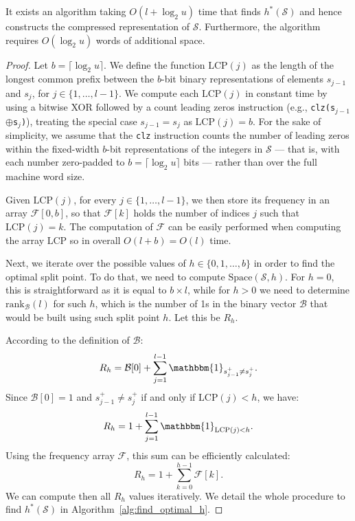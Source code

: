 \begin{theorem}
    It exists an algorithm taking $O(l + \log_2 u)$ time that finds $h^*(\mathcal S)$ and hence constructs the compressed representation of $\mathcal S$. Furthermore, the algorithm requires $O(\log_2 u)$ words of additional space.
\end{theorem}
\begin{proof}
Let \( b = \lceil \log_2 u \rceil \). We define the function \(\mathrm{LCP}(j)\) as the length of the longest common prefix between the \(b\)-bit binary representations of elements \( s_{j-1} \) and \( s_j \), for \( j \in \{1, \dots, l-1\} \). We compute each \(\mathrm{LCP}(j)\) in constant time by using a bitwise XOR followed by a count leading zeros instruction (e.g., \texttt{clz(s\(_{j-1}\)\(\oplus\)s\(_j\))}), treating the special case \(s_{j-1}=s_j\) as \(\mathrm{LCP}(j)=b\). For the sake of simplicity, we assume that the \texttt{clz} instruction counts the number of leading zeros within the fixed-width $b$-bit representations of the integers in $\mathcal S$ — that is, with each number zero-padded to $b = \lceil \log_2 u\rceil$ bits — rather than over the full machine word size.

Given $\mathrm{LCP}(j)$, for every $j \in \{1, \dots, l-1\}$, we then store its frequency in an array $\mathcal{F}[0,b]$, so that $\mathcal{F}[k]$ holds the number of indices $j$ such that $\mathrm{LCP}(j)=k$. The computation of $\mathcal{F}$ can be easily performed when computing the array $\mathrm{LCP}$ so in overall $O(l+b) = O(l)$ time.

Next, we iterate over the possible values of $h \in \{0, 1, \dots, b\}$ in order to find the optimal split point. To do that, we need to compute $\mathrm{Space}(\mathcal S, h)$. For $h = 0$, this is straightforward as it is equal to $b \times l$, while for $h >0$ we need to determine $\mathrm{rank}_{\mathcal{B}}(l)$ for such $h$, which is the number of 1s in the binary vector $\mathcal{B}$ that would be built using such split point $h$. Let this be $R_h$.

According to the definition of $\mathcal{B}$:
\begin{equation*}
    R_h = \mathcal{B}[0] + \sum_{j=1}^{l-1} \mathbbm{1}_{s_{j-1}^+ \neq s_j^+}.
\end{equation*}
Since $\mathcal{B}[0]=1$ and $s_{j-1}^+ \neq s_j^+$ if and only if $\mathrm{LCP}(j) < h$, we have:
\begin{equation*}
    R_h = 1 + \sum_{j=1}^{l-1} \mathbbm{1}_{\mathrm{LCP}(j) < h}.
\end{equation*}
Using the frequency array $\mathcal{F}$, this sum can be efficiently calculated:
\begin{equation*}
    R_h = 1 + \sum_{k=0}^{h-1} \mathcal{F}[k].
\end{equation*}
We can compute then all $R_h$ values iteratively. We detail the whole procedure to find $h^*(\mathcal S)$ in Algorithm~\ref{alg:find_optimal_h}.


\end{proof}
